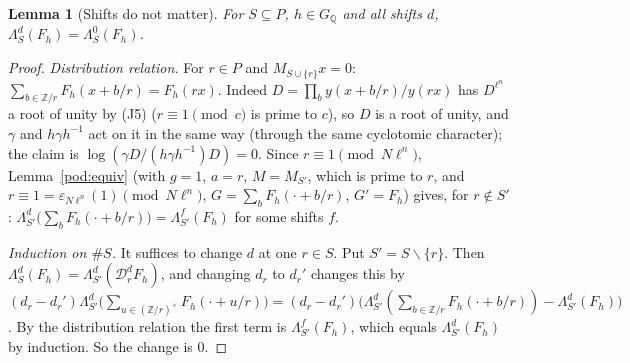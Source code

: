 \documentclass[10pt]{amsart}
\newtheorem{lemma}[theorem]{Lemma}
\theoremstyle{definition}
\theoremstyle{remark}
\newcommand{\Z}{\mathbb Z}
\newcommand{\Q}{\mathbb Q}
\begin{document}
\begin{lemma}[Shifts do not matter]\label{pod:shift}
For $S\subseteq P$, $h\in G_\Q$ and all shifts $d$, $\Lambda_S^d(F_h)=\Lambda_S^0(F_h)$.
\end{lemma}
\begin{proof}
\emph{Distribution relation.} For $r\in P$ and $M_{S\cup\{r\}}x=0$: $\sum_{b\in\Z/r}F_h(x+b/r)=
F_h(rx)$. Indeed $D=\prod_by(x+b/r)/y(rx)$ has $D^{\ell^n}$ a root of unity by (J5) ($r\equiv1\pmod c$
is prime to $c$), so $D$ is a root of unity, and $\gamma$ and $h\gamma h^{-1}$ act on it in the same
way (through the same cyclotomic character); the claim is $\log(\gamma D/(h\gamma h^{-1})D)=0$.
Since $r\equiv1\pmod{N\ell^n}$, Lemma~\ref{pod:equiv} (with $g=1$, $a=r$, $M=M_{S'}$, which is prime to $r$, and $r\equiv1=\varepsilon_{N\ell^n}(1)\pmod{N\ell^n}$, $G=\sum_b F_h(\cdot+b/r)$,
$G'=F_h$) gives, for $r\notin S'$: $\Lambda_{S'}^d\bigl(\sum_bF_h(\cdot+b/r)\bigr)=\Lambda_{S'}^{f}(F_h)$
for some shifts $f$.

\emph{Induction on $\#S$.} It suffices to change $d$ at one $r\in S$. Put $S'=S\smallsetminus\{r\}$.
Then $\Lambda_S^d(F_h)=\Lambda_{S'}^d(\mathcal D_r^dF_h)$, and changing $d_r$ to $d_r'$ changes this by
$(d_r-d_r')\Lambda_{S'}^d\bigl(\sum_{u\in(\Z/r)^\times}F_h(\cdot+u/r)\bigr)=(d_r-d_r')\bigl(
\Lambda_{S'}^d(\textstyle\sum_{b\in\Z/r}F_h(\cdot+b/r))-\Lambda_{S'}^d(F_h)\bigr)$. By the
distribution relation the first term is $\Lambda_{S'}^f(F_h)$, which equals $\Lambda_{S'}^d(F_h)$ by
induction. So the change is $0$.
\end{proof}
\end{document}
